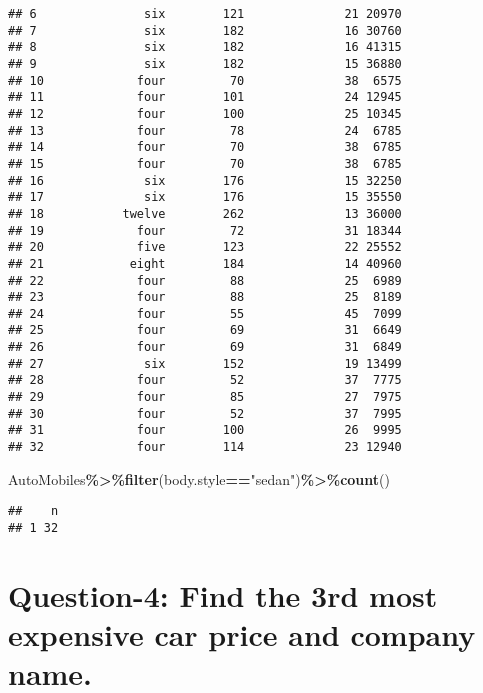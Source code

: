\documentclass[
]{article}
\newenvironment{Shaded}{\begin{snugshade}}{\end{snugshade}}
\newcommand{\FunctionTok}[1]{\textcolor[rgb]{0.13,0.29,0.53}{\textbf{#1}}}
\newcommand{\NormalTok}[1]{#1}
\newcommand{\SpecialCharTok}[1]{\textcolor[rgb]{0.81,0.36,0.00}{\textbf{#1}}}
\newcommand{\StringTok}[1]{\textcolor[rgb]{0.31,0.60,0.02}{#1}}
\begin{document}
\begin{verbatim}
## 6               six        121              21 20970
## 7               six        182              16 30760
## 8               six        182              16 41315
## 9               six        182              15 36880
## 10             four         70              38  6575
## 11             four        101              24 12945
## 12             four        100              25 10345
## 13             four         78              24  6785
## 14             four         70              38  6785
## 15             four         70              38  6785
## 16              six        176              15 32250
## 17              six        176              15 35550
## 18           twelve        262              13 36000
## 19             four         72              31 18344
## 20             five        123              22 25552
## 21            eight        184              14 40960
## 22             four         88              25  6989
## 23             four         88              25  8189
## 24             four         55              45  7099
## 25             four         69              31  6649
## 26             four         69              31  6849
## 27              six        152              19 13499
## 28             four         52              37  7775
## 29             four         85              27  7975
## 30             four         52              37  7995
## 31             four        100              26  9995
## 32             four        114              23 12940
\end{verbatim}

\begin{Shaded}
\begin{Highlighting}[]
\NormalTok{AutoMobiles}\SpecialCharTok{\%\textgreater{}\%}\FunctionTok{filter}\NormalTok{(body.style}\SpecialCharTok{==}\StringTok{"sedan"}\NormalTok{)}\SpecialCharTok{\%\textgreater{}\%}\FunctionTok{count}\NormalTok{()}
\end{Highlighting}
\end{Shaded}

\begin{verbatim}
##    n
## 1 32
\end{verbatim}

\hypertarget{question-4-find-the-3rd-most-expensive-car-price-and-company-name.}{%
\section{Question-4: Find the 3rd most expensive car price and company
name.}\label{question-4-find-the-3rd-most-expensive-car-price-and-company-name.}}
\end{document}
